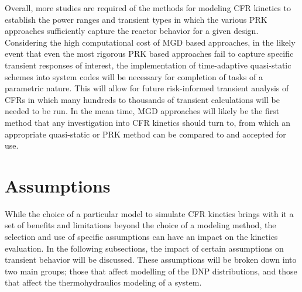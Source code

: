 \documentclass[review]{elsarticle}
\begin{document}
\par Overall, more studies are required of the methods for modeling CFR
kinetics to establish the power ranges and transient
types in which the various PRK approaches sufficiently capture the reactor
 behavior for a given design.
Considering the high computational cost of MGD based approaches, in the likely
 event that even the most rigorous PRK based approaches fail
to capture
specific transient responses of interest, the implementation of time-adaptive
quasi-static schemes into system codes will be necessary for completion of tasks
of a parametric nature. This will allow for
 future
risk-informed transient analysis of CFRs in which many hundreds to thousands
of transient calculations will be needed to be run. In the mean time, MGD
approaches will likely be the first method that any investigation into CFR kinetics
should turn to, from which an appropriate quasi-static or PRK method can be
compared to and accepted for use.

\section{Assumptions} \label{sec:asm}
While the choice of a particular model to simulate CFR kinetics brings
with it a set of benefits and limitations beyond the choice of a modeling
method, the selection and use of specific assumptions can have an
impact on the kinetics evaluation. In the following subsections, the
impact of certain assumptions on transient behavior will be discussed. These
assumptions will be broken down into two main groups; those that affect 
modelling of the DNP distributions, and those that affect the thermohydraulics
modeling of a system.
\end{document}
